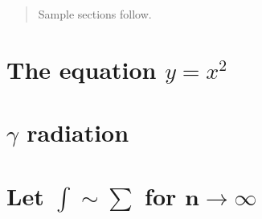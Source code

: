 \documentclass{article}
\begin{document}
\tableofcontents
{}
\begin{abstract}
\centering
Sample sections follow.
\end{abstract}
\section{The equation \texorpdfstring{$y=x^2$}{y=x\texttwosuperior}}
\section{\texorpdfstring{$\gamma$}{\textgamma} radiation}
\section[\texorpdfstring{Let $\int\sim\sum$ for
  $n\rightarrow\infty$}
  {Let \int\sim\sum\ for n\rightarrow\infty}]
  {Let $\bm{\int\sim\sum}$ for $\bm{n\rightarrow\infty}$}
\end{document}
